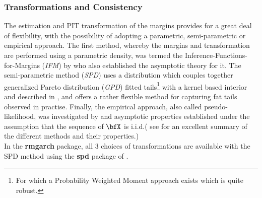 \subsubsection{Transformations and Consistency}\label{II:transformation}
The estimation and PIT transformation of the margins provides for a great deal of
flexibility, with the possibility of adopting a parametric, semi-parametric or
empirical approach. The first method, whereby the margins and transformation are
performed using a parametric density, was termed the Inference-Functions-for-Margins
(\emph{IFM}) by \cite{Joe1997} who also established the asymptotic theory
for it. The semi-parametric method (\emph{SPD}) uses a distribution which couples
together generalized Pareto distribution (\emph{GPD}) fitted tails\footnote{For
which a Probability Weighted Moment approach exists which is quite robust.} with
a kernel based interior and described in \cite{Davison1990}, and offers a rather
flexible method for capturing fat tails observed in practise. Finally, the empirical
approach, also called pseudo-likelihood, was investigated by \cite{Genest1995}
and asymptotic properties established under the assumption that the sequence
of $\bfX$ is i.i.d.( see \cite{Durrleman2000} for an excellent summary of the
different methods and their properties.)\\
In the {\bf rmgarch} package, all 3 choices of transformations are available with
the SPD method using the {\bf spd} package of \cite{Ghalanos2012c}.


